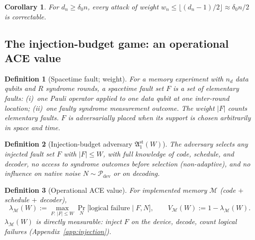 \documentclass[11pt,a4paper]{article}
\newtheorem{corollary}{Corollary}\newtheorem{proposition}{Proposition}
\newtheorem{definition}{Definition}\newtheorem{assumption}{Assumption}
\begin{document}
\begin{corollary}
For $d_n\ge\delta_0 n$, every attack of weight
$w_n\le\lfloor(d_n-1)/2\rfloor\approx\delta_0 n/2$ is correctable.
\end{corollary}

\subsection{The injection-budget game: an operational ACE value}

\begin{definition}[Spacetime fault; weight]\label{def:fault}
For a memory experiment with $n_d$ data qubits and $R$ syndrome rounds,
a \emph{spacetime fault set} $F$ is a set of elementary faults:
(i)~one Pauli operator applied to one data qubit at one inter-round
location; (ii)~one faulty syndrome measurement outcome. The weight
$|F|$ counts elementary faults. $F$ is \emph{adversarially placed} when
its support is chosen arbitrarily in space and time.
\end{definition}

\begin{definition}[Injection-budget adversary $\mathfrak{A}_1^{\mathrm{st}}(W)$]
\label{def:adversary}
The adversary selects any injected fault set $F$ with $|F|\le W$, with
full knowledge of code, schedule, and decoder, no access to syndrome
outcomes before selection (non-adaptive), and no influence on native
noise $N\sim\mathcal{P}_{\mathrm{dev}}$ or on decoding.
\end{definition}

\begin{definition}[Operational ACE value]\label{def:acevalue}
For implemented memory $\mathcal{M}$ (code $+$ schedule $+$ decoder),
\[
\lambda_{\mathcal{M}}(W):=\max_{F:\,|F|\le W}
\Pr_{N}\!\big[\text{logical failure}\mid F,N\big],
\qquad V_{\mathcal{M}}(W):=1-\lambda_{\mathcal{M}}(W).
\]
$\lambda_{\mathcal{M}}(W)$ is directly measurable: inject $F$ on the
device, decode, count logical failures
(Appendix~\ref{app:injection}).
\end{definition}
\end{document}
